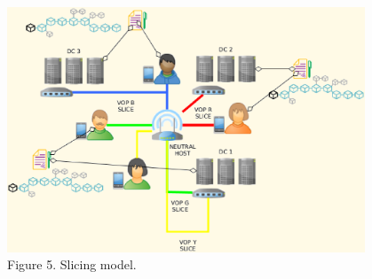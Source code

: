 \documentclass[12pt]{amsart}
\begin{document}
\begin{center}
  \includegraphics[keepaspectratio, width=0.8\textwidth]{images/bc5g/slices-y.eps}
\\
Figure 5. Slicing model.
\\
\end{center}
\end{document}

